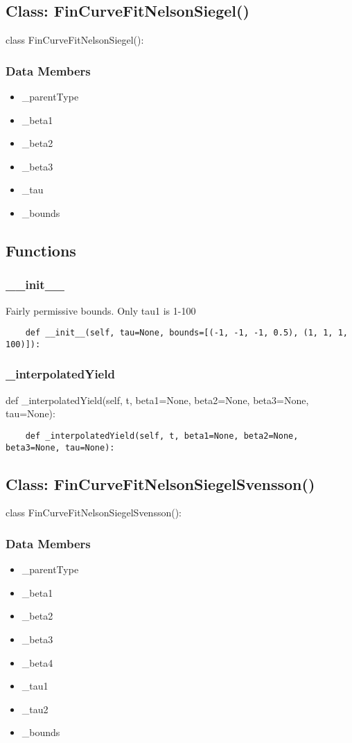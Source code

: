 \documentclass[twoside,11pt]{book}
\begin{document}
\subsection*{Class: FinCurveFitNelsonSiegel()}
class FinCurveFitNelsonSiegel(): 

\subsubsection*{Data Members}
\begin{itemize}
\item{\_parentType}
\item{\_beta1}
\item{\_beta2}
\item{\_beta3}
\item{\_tau}
\item{\_bounds}
\end{itemize}

\subsection*{Functions}

\subsubsection*{{\bf \_\_init\_\_}}
Fairly permissive bounds. Only tau1 is 1-100  

\begin{lstlisting}
    def __init__(self, tau=None, bounds=[(-1, -1, -1, 0.5), (1, 1, 1, 100)]):
\end{lstlisting}

\subsubsection*{{\bf \_interpolatedYield}}
def \_interpolatedYield(self, t, beta1=None, beta2=None, beta3=None, tau=None): 

\begin{lstlisting}
    def _interpolatedYield(self, t, beta1=None, beta2=None, beta3=None, tau=None):
\end{lstlisting}

\subsection*{Class: FinCurveFitNelsonSiegelSvensson()}
class FinCurveFitNelsonSiegelSvensson(): 

\subsubsection*{Data Members}
\begin{itemize}
\item{\_parentType}
\item{\_beta1}
\item{\_beta2}
\item{\_beta3}
\item{\_beta4}
\item{\_tau1}
\item{\_tau2}
\item{\_bounds}
\end{itemize}
\end{document}
